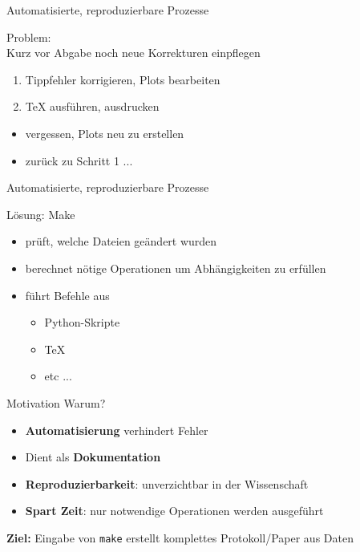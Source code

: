 \begin{frame}{Automatisierte, reproduzierbare Prozesse}

  {\huge Problem:}\\
  \vspace{1em}
  Kurz vor Abgabe noch neue Korrekturen einpflegen
  \begin{enumerate}
    \item Tippfehler korrigieren, Plots bearbeiten
    \item \TeX{} ausführen, ausdrucken
  \end{enumerate}
  \begin{itemize}
    \item vergessen, Plots neu zu erstellen
    \item zurück zu Schritt 1 ...
  \end{itemize}
\end{frame}

\begin{frame}{Automatisierte, reproduzierbare Prozesse}

  {\huge Lösung: Make}
  \vspace{1em}
  \begin{itemize}
    \item prüft, welche Dateien geändert wurden
    \item berechnet nötige Operationen um Abhängigkeiten zu erfüllen
    \item führt Befehle aus
    \begin{itemize}
      \item Python-Skripte
      \item \TeX{}
      \item etc ...
    \end{itemize}
  \end{itemize}
\end{frame}

\begin{frame}{Motivation}
  {\huge Warum?}
  \vspace{1em}
  \begin{itemize}
    \item \textbf{Automatisierung} verhindert Fehler
    \item Dient als \textbf{Dokumentation}
    \item \textbf{Reproduzierbarkeit}: unverzichtbar in der Wissenschaft
    \item \textbf{Spart Zeit}: nur notwendige Operationen werden ausgeführt
  \end{itemize}
  \vspace{1em}
  \textbf{Ziel:} Eingabe von \texttt{make} erstellt komplettes Protokoll/Paper aus Daten
\end{frame}

